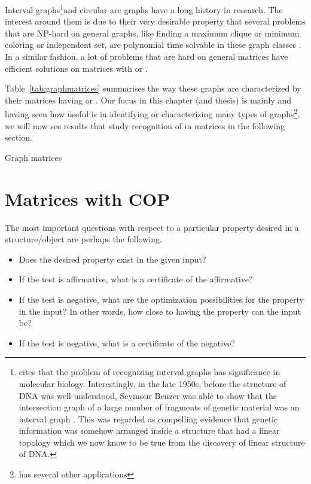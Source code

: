 Interval graphs\footnote{\cite{mcc04} cites that the problem of
  recognizing interval graphs has significance in molecular
  biology. Interestingly, in the late 1950s, before the structure of
  DNA was well-understood, Seymour Benzer was able to show that the
  intersection graph of a large number of fragments of genetic
  material was an interval graph \cite{sb59}. This was regarded as
  compelling evidence that genetic information was somehow arranged
  inside a structure that had a linear topology which we now know to
  be true from the discovery of linear structure of DNA.}and
circular-arc graphs have a long history in research.  The interest
around them is due to their very desirable property that several
problems that are NP-hard 
on general graphs, like finding a maximum clique or minimum coloring
or independent set, are polynomial time solvable in these graph
classes \cite{clrs01}.  In a similar fashion, a lot of problems that
are hard on general matrices have efficient solutions on matrices with
\COP or \CROP \cite[more citations pg.\,33]{d08phd}.

Table~\ref{tab:graphmatrices} summarises the way these graphs are
characterized by their matrices having \COP or \CROP.
Our focus in this chapter (and thesis) is mainly \COP and 
having seen how useful \COP is in identifying or characterizing many
types of graphs\footnote{\COP has several other applications
  }, we will now see results that study recognition of \COP
in matrices in the following section.

\begin{table}[htbp]
  \centering
 \caption{\figtabsize Graph matrices }
  \label{tab:graphmatrices}
\end{table}






\section{Matrices with COP}
\label{sec:surveycoptest}

The most important questions with respect to a particular 
property desired in a structure/object are perhaps the following.
\begin{itemize}%
\singlespacing
\item Does the desired property exist in the given input?
\item If the test is affirmative, what is a certificate of the affirmative?
\item If the test is negative, what are the optimization possibilities
  for the property in the input? In other words, how close to having the
  property can the input be?
\item If the test is negative, what is a certificate of the negative?
\end{itemize}

